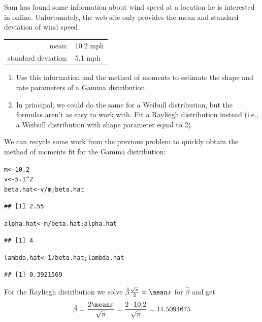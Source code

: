 \documentclass[twoside]{book}\usepackage[]{graphicx}\usepackage[]{xcolor}
\makeatletter
\newcommand{\hlnum}[1]{\textcolor[rgb]{0.686,0.059,0.569}{#1}}%
\newcommand{\hlopt}[1]{\textcolor[rgb]{0,0,0}{#1}}%
\newcommand{\hlstd}[1]{\textcolor[rgb]{0.345,0.345,0.345}{#1}}%
\newcommand{\hlkwb}[1]{\textcolor[rgb]{0.69,0.353,0.396}{#1}}%
\newenvironment{kframe}{%
 \def\at@end@of@kframe{}%
 \ifinner\ifhmode%
  \def\at@end@of@kframe{\end{minipage}}%
  \begin{minipage}{\columnwidth}%
 \fi\fi%
 \def\FrameCommand##1{\hskip\@totalleftmargin \hskip-\fboxsep
 \colorbox{shadecolor}{##1}\hskip-\fboxsep
     \hskip-\linewidth \hskip-\@totalleftmargin \hskip\columnwidth}%
 \MakeFramed {\advance\hsize-\width
   \@totalleftmargin\z@ \linewidth\hsize
   \@setminipage}}%
 {\par\unskip\endMakeFramed%
 \at@end@of@kframe}
\newenvironment{knitrout}{}{} %
\makeatother
\begin{document}
\begin{problem}
	Sam has found some information about wind speed at a location he
	is interested in online.  Unfortunately, the web site only provides
	the mean and standard deviation of wind speed.  
	\begin{center}
		\begin{tabular}{rl}
			mean: &  10.2 mph
			\\
			standard deviation: & 5.1 mph
		\end{tabular}
	\end{center}
	\begin{enumerate}
		\item
	Use this information and the method of moments to estimate the 
	shape and rate parameters of a Gamma distribution.
\item	
	In principal, we could do the same for a Weibull distribution, but the 
	formulas aren't as easy to work with. 
	Fit a Rayliegh distribution instead (i.e., a Weibull
	distribution with shape parameter equal to 2).
	\end{enumerate}
\end{problem}

\begin{solution}
We can recycle some work from the previous problem to quickly obtain
the method of moments fit for the Gamma distribution:
\begin{knitrout}
\color{fgcolor}\begin{kframe}
\begin{alltt}
\hlstd{m} \hlkwb{<-} \hlnum{10.2}
\hlstd{v} \hlkwb{<-} \hlnum{5.1}\hlopt{^}\hlnum{2}
\hlstd{beta.hat} \hlkwb{<-} \hlstd{v}\hlopt{/}\hlstd{m; beta.hat}
\end{alltt}
\begin{verbatim}
## [1] 2.55
\end{verbatim}
\begin{alltt}
\hlstd{alpha.hat} \hlkwb{<-} \hlstd{m} \hlopt{/} \hlstd{beta.hat ; alpha.hat}
\end{alltt}
\begin{verbatim}
## [1] 4
\end{verbatim}
\begin{alltt}
\hlstd{lambda.hat} \hlkwb{<-} \hlnum{1}\hlopt{/} \hlstd{beta.hat ; lambda.hat}
\end{alltt}
\begin{verbatim}
## [1] 0.3921569
\end{verbatim}
\end{kframe}
\end{knitrout}
For the Rayliegh distribution we solve 
	\(
	\hat \beta \frac{\sqrt{\pi}}{2} = \mean x  
	\) for 
	\(\hat \beta\) and get
	\[
	\hat\beta = \frac{2 \mean x }{\sqrt{\pi}}
	= \frac{2 \cdot 10.2 }{\sqrt{\pi}}
	= 11.5094675
	\]	
\end{solution}
\end{document}
